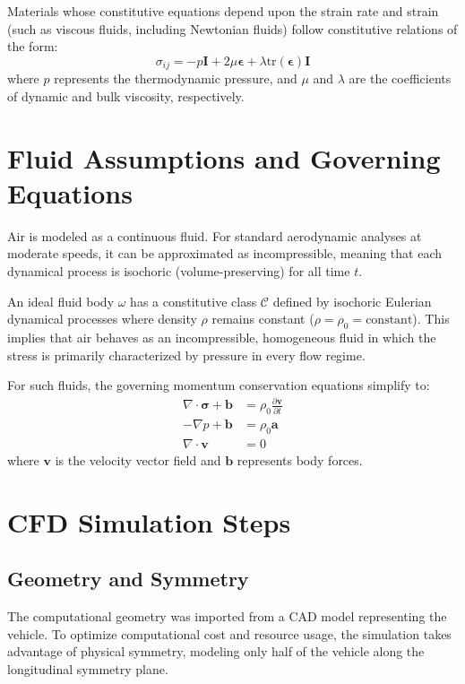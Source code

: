 \documentclass[12pt, a4paper]{article}
\begin{document}
	Materials whose constitutive equations depend upon the strain rate and strain (such as viscous fluids, including Newtonian fluids) follow constitutive relations of the form:
	\begin{equation}
		\sigma_{ij} = -p\mathbf{I} + 2\mu\boldsymbol{\epsilon} + \lambda \text{tr}(\boldsymbol{\epsilon})\mathbf{I}
	\end{equation}
	where $p$ represents the thermodynamic pressure, and $\mu$ and $\lambda$ are the coefficients of dynamic and bulk viscosity, respectively.
	
	\section{Fluid Assumptions and Governing Equations}
	
	Air is modeled as a continuous fluid. For standard aerodynamic analyses at moderate speeds, it can be approximated as incompressible, meaning that each dynamical process is isochoric (volume-preserving) for all time $t$.
	
	An ideal fluid body $\omega$ has a constitutive class $\mathcal{C}$ defined by isochoric Eulerian dynamical processes where density $\rho$ remains constant ($\rho = \rho_0 = \text{constant}$). This implies that air behaves as an incompressible, homogeneous fluid in which the stress is primarily characterized by pressure in every flow regime.
	
	For such fluids, the governing momentum conservation equations simplify to:
	\begin{align}
		\nabla \cdot \boldsymbol{\sigma} + \mathbf{b} &= \rho_0 \frac{\partial \mathbf{v}}{\partial t} \\
		-\nabla p + \mathbf{b} &= \rho_0 \mathbf{a} \\
		\nabla \cdot \mathbf{v} &= 0
	\end{align}
	where $\mathbf{v}$ is the velocity vector field and $\mathbf{b}$ represents body forces.
	
	\section{CFD Simulation Steps}
	
	\subsection{Geometry and Symmetry}
	The computational geometry was imported from a CAD model representing the vehicle. To optimize computational cost and resource usage, the simulation takes advantage of physical symmetry, modeling only half of the vehicle along the longitudinal symmetry plane.
	
\end{document}
